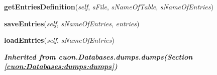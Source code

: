     \vspace{0.5ex}

\hspace{.8\funcindent}\begin{boxedminipage}{\funcwidth}

    \raggedright \textbf{getEntriesDefinition}(\textit{self}, \textit{sFile}, \textit{sNameOfTable}, \textit{sNameOfEntries})

\setlength{\parskip}{2ex}
\setlength{\parskip}{1ex}
    \end{boxedminipage}

    \label{cuon:Windows:cyr_load_entries:cyr_load_entries:saveEntries}

    \vspace{0.5ex}

\hspace{.8\funcindent}\begin{boxedminipage}{\funcwidth}

    \raggedright \textbf{saveEntries}(\textit{self}, \textit{sNameOfEntries}, \textit{entries})

\setlength{\parskip}{2ex}
\setlength{\parskip}{1ex}
    \end{boxedminipage}

    \label{cuon:Windows:cyr_load_entries:cyr_load_entries:loadEntries}

    \vspace{0.5ex}

\hspace{.8\funcindent}\begin{boxedminipage}{\funcwidth}

    \raggedright \textbf{loadEntries}(\textit{self}, \textit{sNameOfEntries})

\setlength{\parskip}{2ex}
\setlength{\parskip}{1ex}
    \end{boxedminipage}


\large{\textbf{\textit{Inherited from cuon.Databases.dumps.dumps\textit{(Section \ref{cuon:Databases:dumps:dumps})}}}}

